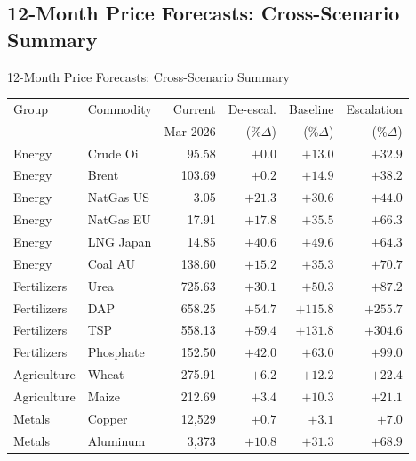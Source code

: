 ﻿\documentclass[aspectratio=1610]{beamer}
\begin{document}
\subsection{12-Month Price Forecasts: Cross-Scenario Summary}

\begin{frame}[shrink=10]{12-Month Price Forecasts: Cross-Scenario Summary}

  \medskip

  \begin{tabular}{llrrrr}
    \toprule
    Group       & Commodity   & Current      & De-escal.    & Baseline     & Escalation  \\
                &             & Mar 2026     & (\%$\Delta$) & (\%$\Delta$) & (\%$\Delta$) \\
    \midrule
    Energy      & Crude Oil   &   95.58 & $+0.0$   & $+13.0$  & $+32.9$  \\
    Energy      & Brent       &  103.69 & $+0.2$   & $+14.9$  & $+38.2$  \\
    Energy      & NatGas US   &    3.05 & $+21.3$  & $+30.6$  & $+44.0$  \\
    Energy      & NatGas EU   &   17.91 & $+17.8$  & $+35.5$  & $+66.3$  \\
    Energy      & LNG Japan   &   14.85 & $+40.6$  & $+49.6$  & $+64.3$  \\
    Energy      & Coal AU     &  138.60 & $+15.2$  & $+35.3$  & $+70.7$  \\
    Fertilizers & Urea        &  725.63 & $+30.1$  & $+50.3$  & $+87.2$  \\
    Fertilizers & DAP         &  658.25 & $+54.7$  & $+115.8$ & $+255.7$ \\
    Fertilizers & TSP         &  558.13 & $+59.4$  & $+131.8$ & $+304.6$ \\
    Fertilizers & Phosphate   &  152.50 & $+42.0$  & $+63.0$  & $+99.0$  \\
    Agriculture & Wheat       &  275.91 & $+6.2$   & $+12.2$  & $+22.4$  \\
    Agriculture & Maize       &  212.69 & $+3.4$   & $+10.3$  & $+21.1$  \\
    Metals      & Copper      & 12{,}529 & $+0.7$ & $+3.1$  & $+7.0$  \\
    Metals      & Aluminum    &  3{,}373 & $+10.8$ & $+31.3$ & $+68.9$ \\
    \bottomrule
  \end{tabular}


\end{frame}
\end{document}
